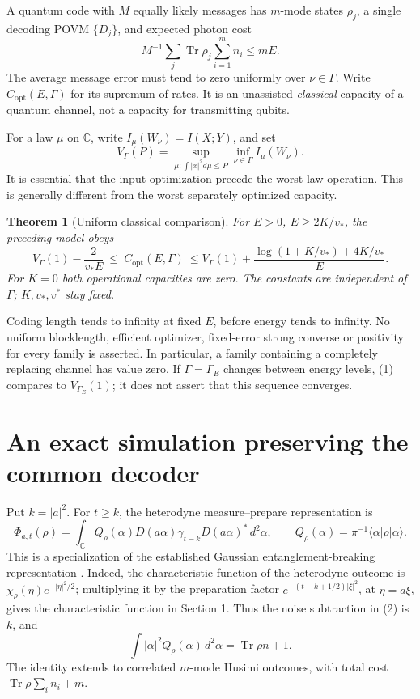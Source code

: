 \documentclass[11pt]{article}
\newtheorem{theorem}{Theorem}
\newcommand{\C}{\mathbb C}
\newcommand{\Tr}{\operatorname{Tr}}
\newcommand{\capq}{C_{\mathrm{opt}}}
\begin{document}
A quantum code with \(M\) equally likely messages has \(m\)-mode states
\(\rho_j\), a single decoding POVM \(\{D_j\}\), and expected photon cost
\[
 M^{-1}\sum_j\Tr\rho_j\sum_{i=1}^m n_i\leq mE .
\]
The average message error must tend to zero uniformly over \(\nu\in\Gamma\).
Write \(\capq(E,\Gamma)\) for its supremum of rates. It is an
unassisted \emph{classical} capacity of a quantum channel, not a
capacity for transmitting qubits.

For a law \(\mu\) on \(\C\), write \(I_\mu(W_\nu)=I(X;Y)\), and set
\[
 V_\Gamma(P)=
 \sup_{\mu:\int|x|^2d\mu\leq P}\inf_{\nu\in\Gamma} I_\mu(W_\nu).
\]
It is essential that the input optimization precede the worst-law
operation. This is generally different from the worst separately
optimized capacity.

\begin{theorem}[Uniform classical comparison]\label{thm:main}
For \(E>0\), \(E\geq 2K/v_*\), the preceding model obeys
\[
 V_\Gamma(1)-\frac{2}{v_*E}
 \ \leq\ \capq(E,\Gamma)\
 \leq V_\Gamma(1)+
 \frac{\log(1+K/v_*)+4K/v_*}{E}.                 \tag{1}
\]
For \(K=0\) both operational capacities are zero.
The constants are independent of \(\Gamma\); \(K,v_*,v^*\) stay fixed.
\end{theorem}

Coding length tends to infinity at fixed \(E\), before energy tends to
infinity. No uniform blocklength, efficient optimizer, fixed-error strong
converse or positivity for every family is asserted. In particular,
a family containing a completely replacing channel has value zero.
If \(\Gamma=\Gamma_E\) changes between energy levels, (1) compares to
\(V_{\Gamma_E}(1)\); it does not assert that this sequence converges.

\section{An exact simulation preserving the common decoder}

Put \(k=|a|^2\). For \(t\geq k\), the heterodyne measure--prepare
representation is
\[
 \Phi_{a,t}(\rho)=\int_\C Q_\rho(\alpha)
           D(a\alpha)\gamma_{t-k}D(a\alpha)^*\,d^2\alpha,\qquad
 Q_\rho(\alpha)=\pi^{-1}\langle\alpha|\rho|\alpha\rangle.       \tag{2}
\]
This is a specialization of the established Gaussian
entanglement-breaking representation \cite{holevoEB,holevoReview}.
Indeed, the characteristic function of the heterodyne outcome is
\(\chi_\rho(\eta)e^{-|\eta|^2/2}\); multiplying it by the preparation
factor \(e^{-(t-k+1/2)|\xi|^2}\), at \(\eta=\bar a\xi\), gives
the characteristic function in Section 1. Thus the noise subtraction
in (2) is \(k\), and
\[
 \int|\alpha|^2Q_\rho(\alpha)\,d^2\alpha=\Tr\rho n+1.          \tag{3}
\]
The identity extends to correlated \(m\)-mode Husimi outcomes, with
total cost \(\Tr\rho\sum_i n_i+m\).
\end{document}
